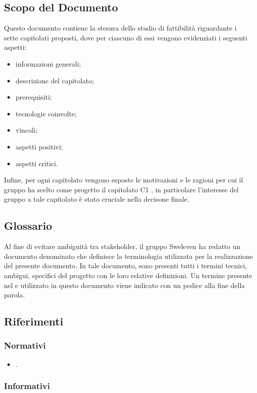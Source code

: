 \subsection{Scopo del Documento}
Questo documento contiene la stesura dello studio di fattibilità riguardante i sette capitolati proposti, dove per ciascuno di essi vengono evidenziati i seguenti aspetti:
\begin{itemize}
    \item informazioni generali;
    \item descrizione del capitolato;
    \item prerequisiti;
    \item tecnologie coinvolte;
    \item vincoli;
    \item aspetti positivi;
    \item aspetti critici.
\end{itemize}
Infine, per ogni capitolato vengono esposte le motivazioni e le ragioni per cui il gruppo ha scelto come progetto il capitolato C1 \NomeProgetto{}, in particolare l’interesse del gruppo a tale capitolato è stato cruciale nella decisone finale.
\subsection{Glossario}
Al fine di evitare ambiguità tra stakeholder, il gruppo Sweleven ha redatto un documento denominato \Glossariov{} che definisce la terminologia utilizzata per la realizzazione del presente documento.
In tale documento, sono presenti tutti i termini tecnici, ambigui, specifici del progetto con le loro relative definizioni.
Un termine presente nel \Gv{} e utilizzato in questo documento viene indicato con un pedice \glo{} alla fine della parola.
\subsection{Riferimenti}

\subsubsection{Normativi}
\begin{itemize}
\item \NdPv {}.
\end{itemize}

\subsubsection{Informativi}

